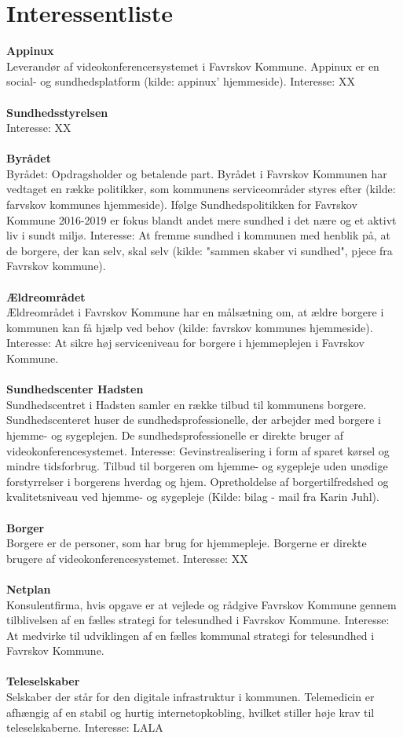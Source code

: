 \documentclass[10pt,a4paper]{article}
\begin{document}
\section{Interessentliste}
\textbf{Appinux}\\
 Leverandør af videokonferencersystemet i Favrskov Kommune. Appinux er en social- og sundhedsplatform (kilde: appinux' hjemmeside).
Interesse: XX\\ \\
\textbf{Sundhedsstyrelsen}\\
Interesse: XX\\ \\
\textbf{Byrådet}\\
Byrådet: Opdragsholder og betalende part. Byrådet i Favrskov Kommunen har vedtaget en række politikker, som kommunens serviceområder styres efter (kilde: farvskov kommunes hjemmeside).
Ifølge Sundhedspolitikken for Favrskov Kommune 2016-2019 er fokus blandt andet mere sundhed i det nære og et aktivt liv i sundt miljø.
Interesse: At fremme sundhed i kommunen med henblik på, at de borgere, der kan selv, skal selv (kilde: "sammen skaber vi sundhed", pjece fra Favrskov kommune).\\ \\
\textbf{Ældreområdet}\\
Ældreområdet i Favrskov Kommune har en målsætning om, at ældre borgere i kommunen kan få hjælp ved behov (kilde: favrskov kommunes hjemmeside).
Interesse: At sikre høj serviceniveau for borgere i hjemmeplejen i Favrskov Kommune. \\ \\
\textbf{Sundhedscenter Hadsten}\\
Sundhedscentret i Hadsten samler en række tilbud til kommunens borgere. Sundhedscenteret huser de sundhedsprofessionelle, der arbejder med borgere i hjemme- og sygeplejen. De sundhedsprofessionelle er direkte bruger af videokonferencesystemet.
Interesse: Gevinstrealisering i form af sparet kørsel og mindre tidsforbrug. Tilbud til borgeren om hjemme- og sygepleje uden unødige forstyrrelser i borgerens hverdag og hjem. Opretholdelse af borgertilfredshed og kvalitetsniveau ved hjemme- og sygepleje (Kilde: bilag - mail fra Karin Juhl).\\ \\
\textbf{Borger}\\
Borgere er de personer, som har brug for hjemmepleje. Borgerne er direkte brugere af videokonferencesystemet.
Interesse: XX\\ \\
\textbf{Netplan}\\
Konsulentfirma, hvis opgave er at vejlede og rådgive Favrskov Kommune gennem tilblivelsen af en fælles strategi for telesundhed i Favrskov Kommune.
Interesse: At medvirke til udviklingen af en fælles kommunal strategi for telesundhed i Favrskov Kommune.\\ \\
\textbf{Teleselskaber}\\
Selskaber der står for den digitale infrastruktur i kommunen. Telemedicin er afhængig af en stabil og hurtig internetopkobling, hvilket stiller høje krav til teleselskaberne. Interesse: LALA
\end{document}
